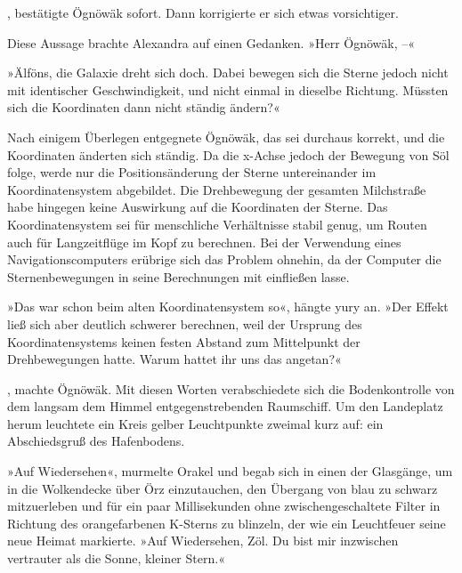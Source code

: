 , bestätigte Ögnöwäk sofort. Dann korrigierte er sich etwas vorsichtiger. 

Diese Aussage brachte Alexandra auf einen Gedanken. »Herr Ögnöwäk, –«


»Älföns, die Galaxie dreht sich doch. Dabei bewegen sich die Sterne jedoch nicht mit identischer Geschwindigkeit, und nicht einmal in dieselbe Richtung. Müssten sich die Koordinaten dann nicht ständig ändern?«

Nach einigem Überlegen entgegnete Ögnöwäk, das sei durchaus korrekt, und die Koordinaten änderten sich ständig. Da die x-Achse jedoch der Bewegung von Söl folge, werde nur die Positionsänderung der Sterne untereinander im Koordinatensystem abgebildet. Die Drehbewegung der gesamten Milchstraße habe hingegen keine Auswirkung auf die Koordinaten der Sterne. Das Koordinatensystem sei für menschliche Verhältnisse stabil genug, um Routen auch für Langzeitflüge im Kopf zu berechnen. Bei der Verwendung eines Navigationscomputers erübrige sich das Problem ohnehin, da der Computer die Sternenbewegungen in seine Berechnungen mit einfließen lasse.

»Das war schon beim alten Koordinatensystem so«, hängte yury an. »Der Effekt ließ sich aber deutlich schwerer berechnen, weil der Ursprung des Koordinatensystems keinen festen Abstand zum Mittelpunkt der Drehbewegungen hatte. Warum hattet ihr uns das angetan?«

, machte Ögnöwäk.  Mit diesen Worten verabschiedete sich die Bodenkontrolle von dem langsam dem Himmel entgegenstrebenden Raumschiff. Um den Landeplatz herum leuchtete ein Kreis gelber Leuchtpunkte zweimal kurz auf: ein Abschiedsgruß des Hafenbodens.

»Auf Wiedersehen«, murmelte Orakel und begab sich in einen der Glasgänge, um in die Wolkendecke über Örz einzutauchen, den Übergang von blau zu schwarz mitzuerleben und für ein paar Millisekunden ohne zwischengeschaltete Filter in Richtung des orangefarbenen K-Sterns zu blinzeln, der wie ein Leuchtfeuer seine neue Heimat markierte. »Auf Wiedersehen, Zöl. Du bist mir inzwischen vertrauter als die Sonne, kleiner Stern.«

